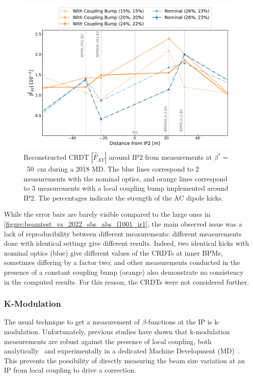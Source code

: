 \begin{figure}[!htb]
    \centering
    \includegraphics*[width=0.95\columnwidth]{Figures/IR_Coupling_Correction/crdt_fxy_nominal_vs_colin_md_2018.pdf}
    \caption{Reconstructed CRDT \(|\hat{F}_{XY}|\) around IP\num{2} from measurements at \(\beta^{\ast} =\)~\qty{50}{\centi\meter} during a \num{2018} MD. The \textcolor{mplblue}{blue} lines correspond to \num{2} measurements with the nominal optics, and \textcolor{mplorange}{orange} lines correspond to \num{3} measurements with a local coupling bump implemented around IP\num{2}. The percentages indicate the strength of the AC dipole kicks.}
    \label{figure:crdt_fxy_nominal_vs_colin_md_2018}
\end{figure}

While the error bars are barely visible compared to the large ones in \cref{figure:beamtest_vs_2022_sbs_abs_f1001_ir1}, the main observed issue was a lack of reproducibility between different measurements: different measurements done with identical settings give different results.
Indeed, two identical kicks with nominal optics (\textcolor{mplblue}{blue}) give different values of the CRDTs at inner BPMs, sometimes differing by a factor two; and other measurements conducted in the presence of a constant coupling bump (\textcolor{mplorange}{orange}) also demonstrate no consistency in the computed results.
For this reason, the CRDTs were not considered further.

\subsubsection*{K-Modulation}

The usual technique to get a measurement of \(\beta\)-functions at the IP is k-modulation.
Unfortunately, previous studies have shown that k-modulation measurements are robust against the presence of local coupling, both analytically~\cite{PRAB:Hofer:Coupling_Local_Observables, PRAB:Carlier:KModulation_HiLumi} and experimentally in a dedicated Machine Development (MD)~\cite{CERN:Persson:Local_Coupling_IP}.
This prevents the possibility of directly measuring the beam size variation at an IP from local coupling to drive a correction. 
\newline

